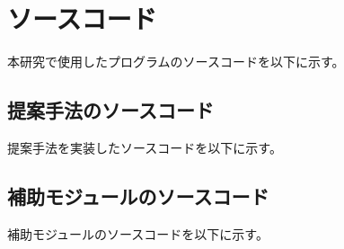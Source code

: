 \clearpage
\appendix %

\chapter{ソースコード}

本研究で使用したプログラムのソースコードを以下に示す。

\section{提案手法のソースコード}
提案手法を実装したソースコードを以下に示す。


\section{補助モジュールのソースコード}
補助モジュールのソースコードを以下に示す。

